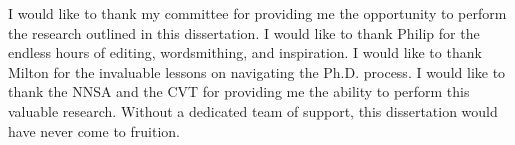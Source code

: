 \begin{acknowledgments}
    I would like to thank my committee for providing me the opportunity to perform the research outlined in this dissertation. I would like to thank Philip for the endless hours of editing, wordsmithing, and inspiration. I would like to thank Milton for the invaluable lessons on navigating the Ph.D. process. I would like to thank the NNSA and the CVT for providing me the ability to perform this valuable research. Without a dedicated team of support, this dissertation would have never come to fruition.
\end{acknowledgments}
